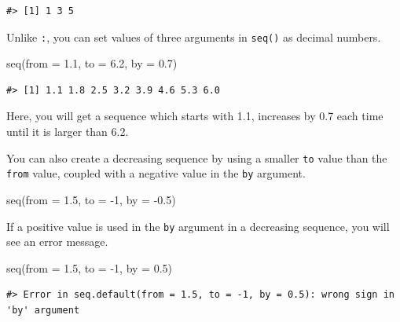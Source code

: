 \documentclass[
]{book}
\newenvironment{Shaded}{\begin{snugshade}}{\end{snugshade}}
\newcommand{\AttributeTok}[1]{\textcolor[rgb]{0.77,0.63,0.00}{#1}}
\newcommand{\DecValTok}[1]{\textcolor[rgb]{0.00,0.00,0.81}{#1}}
\newcommand{\FloatTok}[1]{\textcolor[rgb]{0.00,0.00,0.81}{#1}}
\newcommand{\FunctionTok}[1]{\textcolor[rgb]{0.00,0.00,0.00}{#1}}
\newcommand{\NormalTok}[1]{#1}
\newcommand{\SpecialCharTok}[1]{\textcolor[rgb]{0.00,0.00,0.00}{#1}}
\begin{document}
\begin{verbatim}
#> [1] 1 3 5
\end{verbatim}

Unlike \texttt{:}, you can set values of three arguments in \texttt{seq()} as decimal numbers.

\begin{Shaded}
\begin{Highlighting}[]
\FunctionTok{seq}\NormalTok{(}\AttributeTok{from =} \FloatTok{1.1}\NormalTok{, }\AttributeTok{to =} \FloatTok{6.2}\NormalTok{, }\AttributeTok{by =} \FloatTok{0.7}\NormalTok{) }
\end{Highlighting}
\end{Shaded}

\begin{verbatim}
#> [1] 1.1 1.8 2.5 3.2 3.9 4.6 5.3 6.0
\end{verbatim}

Here, you will get a sequence which starts with 1.1, increases by 0.7 each time until it is larger than 6.2.

You can also create a decreasing sequence by using a smaller \texttt{to} value than the \texttt{from} value, coupled with a negative value in the \texttt{by} argument.

\begin{Shaded}
\begin{Highlighting}[]
\FunctionTok{seq}\NormalTok{(}\AttributeTok{from =} \FloatTok{1.5}\NormalTok{, }\AttributeTok{to =} \SpecialCharTok{{-}}\DecValTok{1}\NormalTok{, }\AttributeTok{by =} \SpecialCharTok{{-}}\FloatTok{0.5}\NormalTok{) }
\end{Highlighting}
\end{Shaded}

If a positive value is used in the \texttt{by} argument in a decreasing sequence, you will see an error message.

\begin{Shaded}
\begin{Highlighting}[]
\FunctionTok{seq}\NormalTok{(}\AttributeTok{from =} \FloatTok{1.5}\NormalTok{, }\AttributeTok{to =} \SpecialCharTok{{-}}\DecValTok{1}\NormalTok{, }\AttributeTok{by =} \FloatTok{0.5}\NormalTok{) }
\end{Highlighting}
\end{Shaded}

\begin{verbatim}
#> Error in seq.default(from = 1.5, to = -1, by = 0.5): wrong sign in 'by' argument
\end{verbatim}
\end{document}
